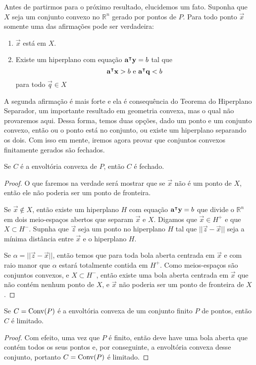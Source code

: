 Antes de partirmos para o próximo resultado, elucidemos um fato. Suponha que
$X$ seja um conjunto convexo no $\mathbb{R}^n$ gerado por pontos de $P$.
Para todo ponto $\vec x$ somente uma das afirmações pode ser verdadeira:

\begin{enumerate}
  \item $\vec x$ está em $X$.
  \item Existe um hiperplano com equação $\mathbf{a}^\intercal \mathbf y = b$ tal que
  \[
    \mathbf{a}^\intercal \mathbf x > b \text{ e } \mathbf{a}^\intercal \mathbf q < b
  \]
  para todo $\vec q \in X$
\end{enumerate}

A segunda afirmação é mais forte e ela é consequência do Teorema do
Hiperplano Separador, um importante resultado em geometria convexa, mas
o qual não provaremos aqui. Dessa forma, temos duas opções, dado um ponto
e um conjunto convexo, então ou o ponto está no conjunto, ou existe um
hiperplano separando os dois. Com isso em mente, iremos agora provar
que conjuntos convexos finitamente gerados são fechados.

\begin{prop:conjuntos convexos fechados}
Se $C$ é a envoltória convexa de $P$, então $C$ é fechado.
  \begin{proof}
    O que faremos na verdade será mostrar que se $\vec x$ não é um ponto de $X$,
    então ele não poderia ser um ponto de fronteira.

    Se $\vec x \notin X$, então existe um hiperplano $H$ com
    equação $\mathbf{a}^\intercal \mathbf y = b$ que divide
    o $\mathbb{R}^n$ em dois meio-espaços abertos que separam
    $\vec x$ e $X$. Digamos que $\vec x \in H^+$ e que $X \subset H^-$.
    Supnha que $\vec z$ seja um ponto no hiperplano $H$ tal que
    $|| \vec z - \vec x ||$ seja a mínima distância entre $\vec x$
    e o hiperplano $H$.

    Se $\alpha = || \vec z - \vec x ||$,
    então temos que para toda bola aberta centrada em $\vec x$
    e com raio manor que $\alpha$ estará totalmente contida em
    $H^+$. Como meios-espaços são conjuntos convexos, e $X \subset H^-$,
    então existe uma bola aberta centrada em $\vec x$ que não
    contém nenhum ponto de $X$, e $\vec x$ não poderia ser
    um ponto de fronteira de $X$.
  \end{proof}
\end{prop:conjuntos convexos fechados}

\begin{prop:conjuntos convexos limitados}
  Se $C = \mathrm{Conv}(P)$ é a envoltória convexa de um conjunto finito $P$ de pontos,
  então $C$ é limitado.

  \begin{proof}
   Com efeito, uma vez que $P$ é finito, então deve have uma bola aberta que
   contém todos os seus pontos e, por conseguinte, a envoltória convexa desse
   conjunto, portanto $C = \mathrm{Conv}(P)$ é limitado.
  \end{proof}
\end{prop:conjuntos convexos limitados}

